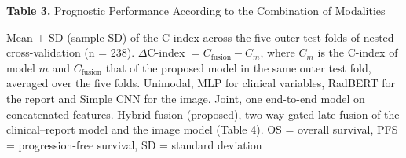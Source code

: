 \documentclass[border=8pt]{standalone}
\newif\ifshowtitle \showtitletrue
\newif\ifshownotes \shownotestrue
\begin{document}
\sbox{}%
\begin{minipage}{\wd\tablebox}
\ifshowtitle\noindent \textbf{Table 3.} Prognostic Performance According to the Combination of Modalities\par\vspace{4pt}\fi
\noindent\usebox\tablebox
\ifshownotes\par\vspace{3pt}\footnotesize\noindent Mean $\pm$ SD (sample SD) of the C-index across the five outer test folds of nested cross-validation (n = 238). $\Delta$C-index $= C_{\mathrm{fusion}} - C_{m}$, where $C_{m}$ is the C-index of model $m$ and $C_{\mathrm{fusion}}$ that of the proposed model in the same outer test fold, averaged over the five folds. Unimodal, MLP for clinical variables, RadBERT for the report and Simple CNN for the image. Joint, one end-to-end model on concatenated features. Hybrid fusion (proposed), two-way gated late fusion of the clinical--report model and the image model (Table 4). OS = overall survival, PFS = progression-free survival, SD = standard deviation\par\fi
\end{minipage}
\end{document}
